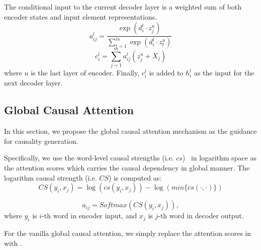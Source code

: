 The conditional input to the current 
decoder layer is a weighted sum of both encoder states and input element representations.
\begin{equation}\label{eq:a}
a _ { i j } ^ { l } = \frac { \exp \left( d _ { i } ^ { l } \cdot z _ { j } ^ { u } \right) } { \sum _ { t = 1 } ^ { m } \exp \left( d _ { i } ^ { l } \cdot z _ { t } ^ { u } \right) }
\end{equation}
\begin{equation}\label{eq:c}
c _ { i } ^ { l } = \sum _ { j = 1 } ^ { m } a _ { i j } ^ { l } \left( z _ { j } ^ { u } + X_j \right)
\end{equation}
where $u$ is the last layer of encoder.  
Finally, $c _ { i } ^ { l }$ is added to $h_{i}^{l}$ as the input for the next decoder layer.


\subsection{Global Causal Attention}
In this section, we propose the global causal attention mechanism as the guidance for causality generation.

Specifically, we use the word-level causal strengths (i.e. $cs$)~\cite{} in logarithm space as the attention scores which carries the causal dependency in global manner.
The logarithm causal strength (i.e. $CS$) is computed as:
\begin{equation}\label{eq:acs}
CS(y_i, x_j) = \log\left(cs(y_i,x_j)\right) - \log\left(min\{cs(\cdot, \cdot)\}\right)
\end{equation}

\begin{equation}
\label{eq:causal_attn}
a _ { i j }= Softmax\left( CS(y_i, x_j) \right) ,
\end{equation}
where $y_i$ is $i$-th word in encoder input, 
and $x_j$ is $j$-th word in decoder output.

For the vanilla global causal attention, 
we simply replace the attention scores in  with .

